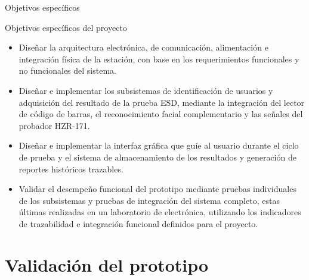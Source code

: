 \documentclass[aspectratio=169]{beamer}
\newcommand{\rightfootertext}{}
\newcommand{\setrightfooter}[1]{\gdef\rightfootertext{#1}}
\begin{document}
\begin{frame}{Objetivos específicos}

    \begin{block}{Objetivos específicos del proyecto}
    \scriptsize
    \begin{itemize}

        \item Diseñar la arquitectura electrónica, de comunicación, alimentación e
        integración física de la estación, con base en los requerimientos funcionales
        y no funcionales del sistema.

        \item Diseñar e implementar los subsistemas de identificación de usuarios y
        adquisición del resultado de la prueba ESD, mediante la integración del lector
        de código de barras, el reconocimiento facial complementario y las señales del
        probador HZR-171.

        \item Diseñar e implementar la interfaz gráfica que guíe al usuario durante el
        ciclo de prueba y el sistema de almacenamiento de los resultados y generación
        de reportes históricos trazables.

        \item Validar el desempeño funcional del prototipo mediante pruebas individuales
        de los subsistemas y pruebas de integración del sistema completo, estas últimas
        realizadas en un laboratorio de electrónica, utilizando los indicadores de
        trazabilidad e integración funcional definidos para el proyecto.

    \end{itemize}
    \end{block}

\end{frame}


\section{Validación del prototipo}
\setrightfooter{}
\end{document}
